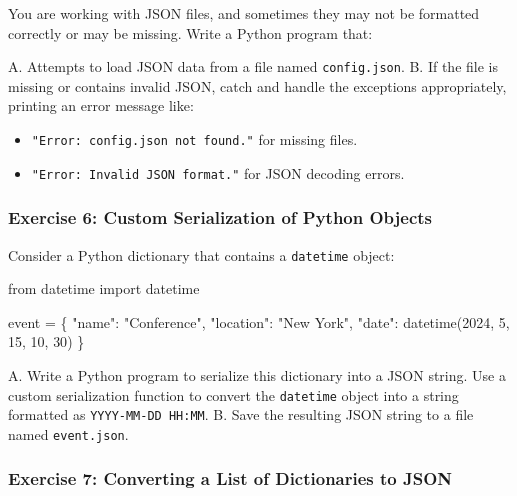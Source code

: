 \documentclass[
  letterpaper,
  DIV=11,
  numbers=noendperiod]{scrreprt}
\newenvironment{Shaded}{\begin{snugshade}}{\end{snugshade}}
\newcommand{\DecValTok}[1]{\textcolor[rgb]{0.68,0.00,0.00}{#1}}
\newcommand{\ImportTok}[1]{\textcolor[rgb]{0.00,0.46,0.62}{#1}}
\newcommand{\NormalTok}[1]{\textcolor[rgb]{0.00,0.23,0.31}{#1}}
\newcommand{\OperatorTok}[1]{\textcolor[rgb]{0.37,0.37,0.37}{#1}}
\newcommand{\StringTok}[1]{\textcolor[rgb]{0.13,0.47,0.30}{#1}}
\providecommand{\tightlist}{%
  \setlength{\itemsep}{0pt}\setlength{\parskip}{0pt}}\usepackage{longtable,booktabs,array}
\begin{document}
You are working with JSON files, and sometimes they may not be formatted
correctly or may be missing. Write a Python program that:

A. Attempts to load JSON data from a file named \texttt{config.json}. B.
If the file is missing or contains invalid JSON, catch and handle the
exceptions appropriately, printing an error message like:

\begin{itemize}
\tightlist
\item
  \texttt{"Error:\ config.json\ not\ found."} for missing files.
\item
  \texttt{"Error:\ Invalid\ JSON\ format."} for JSON decoding errors.
\end{itemize}

\hypertarget{exercise-6-custom-serialization-of-python-objects}{%
\subsubsection{Exercise 6: Custom Serialization of Python
Objects}\label{exercise-6-custom-serialization-of-python-objects}}

Consider a Python dictionary that contains a \texttt{datetime} object:

\begin{Shaded}
\begin{Highlighting}[]
\ImportTok{from}\NormalTok{ datetime }\ImportTok{import}\NormalTok{ datetime}

\NormalTok{event }\OperatorTok{=}\NormalTok{ \{}
    \StringTok{"name"}\NormalTok{: }\StringTok{"Conference"}\NormalTok{,}
    \StringTok{"location"}\NormalTok{: }\StringTok{"New York"}\NormalTok{,}
    \StringTok{"date"}\NormalTok{: datetime(}\DecValTok{2024}\NormalTok{, }\DecValTok{5}\NormalTok{, }\DecValTok{15}\NormalTok{, }\DecValTok{10}\NormalTok{, }\DecValTok{30}\NormalTok{)}
\NormalTok{\}}
\end{Highlighting}
\end{Shaded}

A. Write a Python program to serialize this dictionary into a JSON
string. Use a custom serialization function to convert the
\texttt{datetime} object into a string formatted as
\texttt{YYYY-MM-DD\ HH:MM}. B. Save the resulting JSON string to a file
named \texttt{event.json}.

\hypertarget{exercise-7-converting-a-list-of-dictionaries-to-json}{%
\subsubsection{Exercise 7: Converting a List of Dictionaries to
JSON}\label{exercise-7-converting-a-list-of-dictionaries-to-json}}
\end{document}
